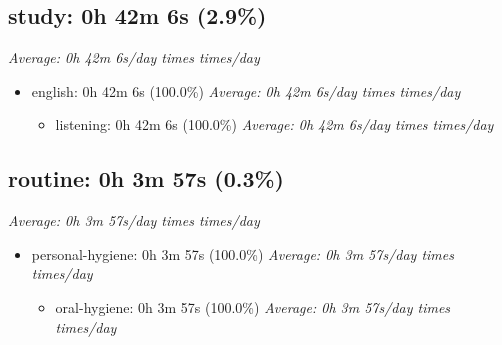 \documentclass[12pt]{extarticle}
\begin{document}
{\fontsize{16}{19.2}\selectfont\subsection*{study: 0h 42m 6s (2.9\%)}}
\textit{Average: 0h 42m 6s/day  times  times/day}\par
\begin{itemize}[topsep=0pt, itemsep=-0.5ex]
    \item english: 0h 42m 6s (100.0\%)
        \textit{Average: 0h 42m 6s/day  times  times/day}\par
\begin{itemize}[topsep=0pt, itemsep=-0.5ex]
    \item listening: 0h 42m 6s (100.0\%)
        \textit{Average: 0h 42m 6s/day  times  times/day}\par
\end{itemize}
\end{itemize}
{\fontsize{16}{19.2}\selectfont\subsection*{routine: 0h 3m 57s (0.3\%)}}
\textit{Average: 0h 3m 57s/day  times  times/day}\par
\begin{itemize}[topsep=0pt, itemsep=-0.5ex]
    \item personal-hygiene: 0h 3m 57s (100.0\%)
        \textit{Average: 0h 3m 57s/day  times  times/day}\par
\begin{itemize}[topsep=0pt, itemsep=-0.5ex]
    \item oral-hygiene: 0h 3m 57s (100.0\%)
        \textit{Average: 0h 3m 57s/day  times  times/day}\par
\end{itemize}
\end{itemize}
\end{document}
